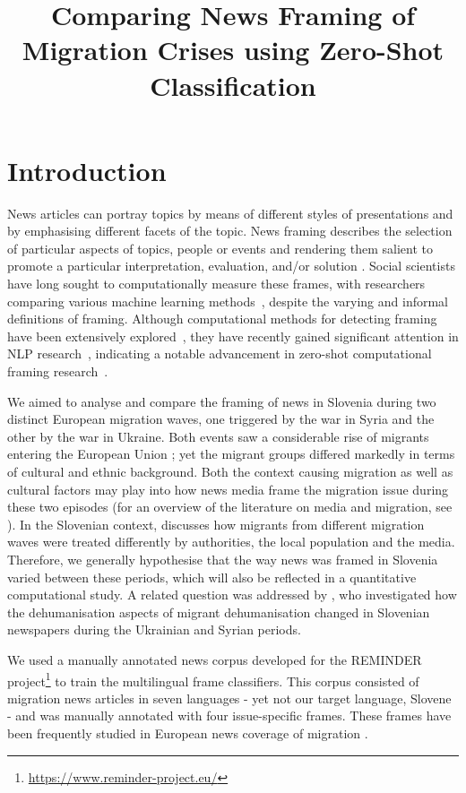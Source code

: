 \documentclass[10pt, a4paper]{article}
\title{Comparing News Framing of Migration Crises using Zero-Shot Classification}
\begin{document}
\maketitleabstract

\section{Introduction}
\label{sec:introduction}

News articles can portray topics by means of different styles of presentations and by emphasising different facets of the topic.
News framing describes the selection of particular aspects of topics, people or events and rendering them salient to promote a particular interpretation, evaluation, and/or solution \citep{entman_framing_1993, entman_cascading_2003, de_vreese2005}.
Social scientists have long sought to computationally measure these frames, with researchers comparing various machine learning methods~\citep{burscher_2014, eisele_2023, lind_2021}, despite the varying and informal definitions of framing. Although computational methods for detecting framing have been extensively explored~\citep{ali-hassan-2022-survey}, they have recently gained significant attention in NLP research~\citep{piskorski-etal-2023-semeval, eisele_2023}, indicating a notable advancement in zero-shot computational framing research~\citep{wu-etal-2023-sheffieldveraai, reiter-haas-etal-2023-mcpt}.

We aimed to analyse and compare the framing of news in Slovenia during two distinct European migration waves, one triggered by the war in Syria and the other by the war in Ukraine. Both events saw a considerable rise of migrants entering the European Union \citep{KogovsekBajt, niemann}; yet the migrant groups differed markedly in terms of cultural and ethnic background. Both the context causing migration as well as cultural factors may play into how news media frame the migration issue during these two episodes (for an overview of the literature on media and migration, see \citealp{eberl_2018}). In the Slovenian context, \citealp{bucarRucman} discusses how migrants from different migration waves were treated differently by authorities, the local population and the media. Therefore, we generally hypothesise that the way news was framed in Slovenia varied between these periods, which will also be reflected in a quantitative computational study. A related question was addressed by \citealp{caporusso_2024}, who investigated how the dehumanisation aspects of migrant dehumanisation changed in Slovenian newspapers during the Ukrainian and Syrian periods.

We used a manually annotated news corpus  developed for the REMINDER project\footnote{\url{https://www.reminder-project.eu/}} to train the multilingual frame classifiers.
This corpus consisted of migration news articles in seven languages - yet not our target language, Slovene - and was manually annotated with four issue-specific frames. These frames have been frequently studied in European news coverage of migration \citep{eberl_2018, chouliaraki_2017}.
\end{document}
